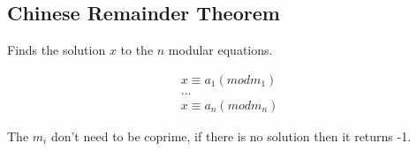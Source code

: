 \subsection{Chinese Remainder Theorem}

Finds the solution $x$  to the $n$ modular equations.

\begin{equation}
  \begin{aligned}
    x \equiv a_1 (mod m_1) \\ 
    ... \\
    x \equiv a_n (mod m_n)
  \end{aligned}
\end{equation}



The $m_i$ don't need to be coprime, if there is no solution then it returns -1.
